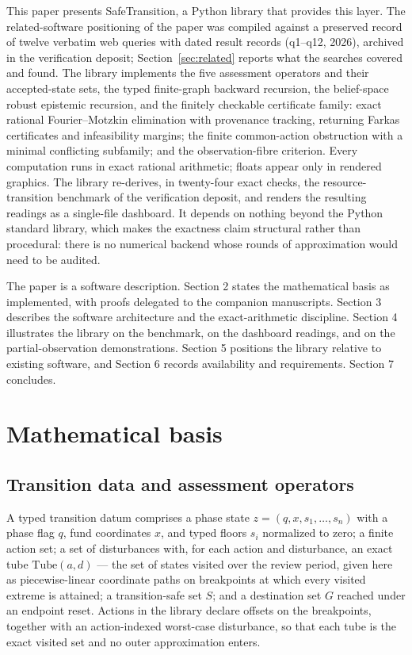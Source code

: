 \documentclass[3p,11pt]{elsarticle}
\begin{document}
This paper presents SafeTransition, a Python library that provides this
layer. The related-software positioning of the paper was compiled against a
preserved record of twelve verbatim web queries with dated result records
(q1--q12, 2026), archived in the verification deposit; Section~\ref{sec:related}
reports what the searches covered and found. The library implements the five assessment operators and their
accepted-state sets, the typed finite-graph backward recursion, the
belief-space robust epistemic recursion, and the finitely checkable
certificate family: exact rational Fourier--Motzkin elimination with
provenance tracking, returning Farkas certificates and infeasibility
margins; the finite common-action obstruction with a minimal conflicting
subfamily; and the observation-fibre criterion. Every computation runs in
exact rational arithmetic; floats appear only in rendered graphics. The
library re-derives, in twenty-four exact checks, the resource-transition
benchmark of the verification deposit, and renders the resulting readings as
a single-file dashboard. It depends on nothing beyond the Python standard
library, which makes the exactness claim structural rather than procedural:
there is no numerical backend whose rounds of approximation would need to be
audited.

The paper is a software description. Section 2 states the mathematical basis
as implemented, with proofs delegated to the companion manuscripts.
Section 3 describes the software architecture and the exact-arithmetic
discipline. Section 4 illustrates the library on the benchmark, on the
dashboard readings, and on the partial-observation demonstrations. Section 5
positions the library relative to existing software, and Section 6 records
availability and requirements. Section 7 concludes.

\section{Mathematical basis}\label{sec:math}

\subsection{Transition data and assessment operators}\label{sec:operators}

A typed transition datum comprises a phase state
$z = (q, x, s_1, \dots, s_n)$ with a phase flag $q$, fund coordinates $x$,
and typed floors $s_i$ normalized to zero; a finite action set; a set of disturbances with, for each action and
disturbance, an exact tube $\mathrm{Tube}(a, d)$ --- the set of states
visited over the review period, given here as piecewise-linear coordinate
paths on breakpoints at which every visited extreme is attained; a
transition-safe set $S$; and a destination set $G$ reached under an endpoint
reset. Actions in the library declare offsets on the breakpoints, together
with an action-indexed worst-case disturbance, so that each tube is the
exact visited set and no outer approximation enters.
\end{document}
